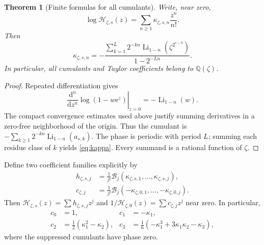 \documentclass[11pt,letterpaper]{article}
\numberwithin{equation}{section}
\newtheorem{theorem}{Theorem}[section]
\theoremstyle{definition}
\theoremstyle{remark}
\newcommand{\Q}{\mathbb Q}
\newcommand{\Li}{\operatorname{Li}}
\newcommand{\B}{\mathcal B}
\newcommand{\Hp}{\mathcal H}
\newcommand{\e}{\mathrm e}
\begin{document}
\begin{theorem}[Finite formulas for all cumulants]
\label{thm:cumulants}
Write, near zero,
\begin{equation}
 \log\Hp_{\zeta,s}(z)=\sum_{n\geq1}\kappa_{\zeta,s,n}\frac{z^n}{n!}.
\end{equation}
Then
\begin{equation}
 \boxed{\quad
 \kappa_{\zeta,s,n}=
 -\frac{\displaystyle\sum_{k=1}^L2^{-kn}
       \Li_{1-n}(\zeta^{2^{s-k}})}{1-2^{-Ln}}.
 \quad}
 \label{eq:kappa}
\end{equation}
In particular, all cumulants and Taylor coefficients belong to \(\Q(\zeta)\).
\end{theorem}
\begin{proof}
Repeated differentiation gives
\[
 \left.\frac{\mathrm d^n}{\mathrm dz^n}\log(1-w\e^z)\right|_{z=0}
 =-\Li_{1-n}(w).
\]
The compact convergence estimates used above justify summing derivatives in a zero-free neighborhood of the origin. Thus the cumulant is
\(-\sum_{k\geq1}2^{-kn}\Li_{1-n}(a_{s,k})\).
The phase is periodic with period \(L\); summing each residue class of \(k\) yields \eqref{eq:kappa}. Every summand is a rational function of \(\zeta\).
\end{proof}

Define two coefficient families explicitly by
\begin{align}
 h_{\zeta,s,j}
 &=\frac1{j!}\B_j(\kappa_{\zeta,s,1},\ldots,\kappa_{\zeta,s,j}),
 \label{eq:hcoeff}\\
 c_{\zeta,j}
 &=\frac1{j!}\B_j(-\kappa_{\zeta,0,1},\ldots,-\kappa_{\zeta,0,j}).
 \label{eq:ccoeff}
\end{align}
Then \(\Hp_{\zeta,s}(z)=\sum h_{\zeta,s,j}z^j\) and
\(1/\Hp_{\zeta,0}(z)=\sum c_{\zeta,j}z^j\) near zero. In particular,
\begin{align}
 c_0&=1,&c_1&=-\kappa_1,\\
 c_2&=\tfrac12(\kappa_1^2-\kappa_2),&
 c_3&=\tfrac16(-\kappa_1^3+3\kappa_1\kappa_2-\kappa_3),
 \label{eq:firstc}
\end{align}
where the suppressed cumulants have phase zero.
\end{document}
